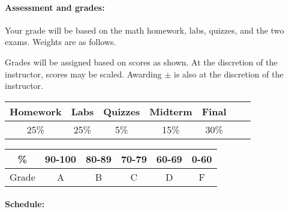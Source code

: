 \documentclass{article}
\begin{document}
\paragraph{Assessment and grades:}

Your grade will be based on the math homework, labs, quizzes, and the two
exams. Weights are as follows.

Grades will be assigned based on scores as shown.  At the discretion
of the instructor, scores may be scaled.  Awarding $\pm$ is also at
the discretion of the instructor.

\begin{tabular}{|c|c|c|c|c|c|c|}\hline
Homework & Labs & Quizzes & Midterm & Final\\\hline
25\% & 25\% & 5\% & 15\% & 30\% \\\hline
\end{tabular}\hfill
\begin{tabular}{|c|c|c|c|c|c|}\hline
\% & 90-100 & 80-89 & 70-79 & 60-69 & 0-60\\\hline
Grade & A & B & C & D & F\\\hline
\end{tabular}


  
\paragraph{Schedule:}
\end{document}
